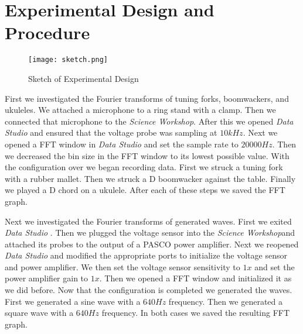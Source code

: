 \documentclass{article}
\newcommand{\dataStudio}[0]{\textit{Data Studio} }
\newcommand{\workshop}[0]{\textit{Science Workshop}}
\begin{document}
\section{Experimental Design and Procedure}
\begin{figure}[h!]
  \centering
  \caption{Sketch of Experimental Design}
  \vspace{0.3em}
  \texttt{[image: sketch.png]} 
\end{figure}
First we investigated the Fourier transforms of tuning forks, boomwackers, and
ukuleles. We attached a microphone to a ring stand with a clamp. Then we
connected that microphone to the \workshop. After this we
opened \dataStudio and ensured that the voltage probe was sampling at
$\num{10}\si{kHz}$. Next we opened a FFT window in \dataStudio and set the
sample rate to $\num{20000}\si{Hz}$. Then we decreased the bin size in the FFT
window to its lowest possible value. With the configuration over we began
recording data. First we struck a tuning fork with a rubber mallet. Then we
struck a D boomwacker against the table. Finally we played a D
chord on a ukulele. After each of these steps we saved the FFT graph.

Next we investigated the Fourier transforms of generated waves. First we exited
\dataStudio. Then we plugged the voltage sensor into the \workshop and attached
its probes to the output of a PASCO power amplifier. Next we reopened
\dataStudio and modified the appropriate ports to initialize the voltage sensor and
power amplifier. We then set the voltage sensor sensitivity to $1x$ and set the
power amplifier gain to $1x$. Then we opened a FFT window and initialized it as
we did before. Now that the configuration is completed we generated the waves.
First we generated a sine wave with a $\num{640}\si{Hz}$ frequency. Then we
generated a square wave with a $\num{640}\si{Hz}$ frequency. In both cases we
saved the resulting FFT graph.
\end{document}
